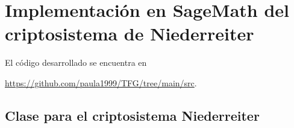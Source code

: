 \chapter[Implementación en SageMath del criptosistema de Niederreiter]{Implementación en SageMath del criptosistema de Niederreiter}
\label{annex:sage-Niederreiter}


El código desarrollado se encuentra en
\begin{center}
\url{https://github.com/paula1999/TFG/tree/main/src}.
\end{center}


\section{Clase para el criptosistema Niederreiter}

